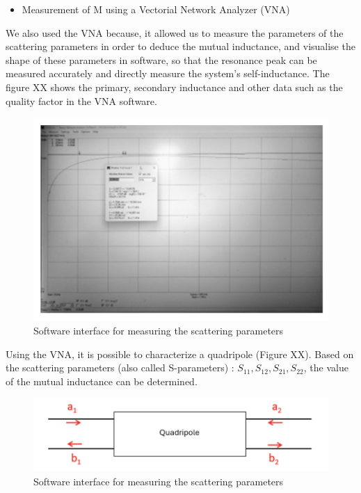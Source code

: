 \documentclass[conference]{IEEEtran}
\begin{document}
\begin{itemize}
	\item Measurement of M using a Vectorial Network Analyzer (VNA)
\end{itemize}
We also used the VNA because, it allowed us to measure the parameters of the
scattering parameters in order to deduce the mutual inductance, and visualise the shape of these parameters in software, so that the resonance peak can be measured accurately
and directly measure the system's self-inductance.
The figure XX shows the primary, secondary inductance and other data such as the
quality factor in the VNA software.
\begin{figure}[htbp]
	\centerline{\includegraphics[width=\linewidth]{images/25.png}}
	\caption{Software interface for measuring the scattering parameters}
	\label{fig}
\end{figure}
Using the VNA, it is possible to characterize a quadripole (Figure XX). Based on the
scattering parameters (also called S-parameters) : \(S_{11}, S_{12}, S_{21}, S_{22}\), the value of the
mutual inductance can be determined.
\begin{figure}[htbp]
	\centerline{\includegraphics[width=\linewidth]{images/26.png}}
	\caption{Software interface for measuring the scattering parameters}
	\label{fig}
\end{figure}
\end{document}
